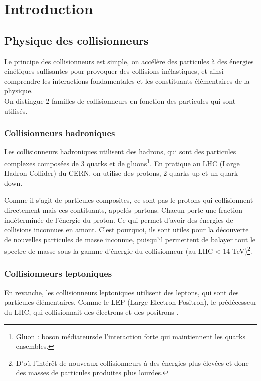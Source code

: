 \documentclass[10pt,a4paper]{report}
\begin{document}
\chapter{Introduction}

\section{Physique des collisionneurs}

Le principe des collisionneurs est simple, on accélère des particules à des 
énergies cinétiques suffisantes pour provoquer des collisions inélastiques, et ainsi comprendre les interactions fondamentales et les constituants élémentaires de la physique.\\

On distingue 2 familles de collisionneurs en fonction des particules qui sont utilisés.

\subsection{Collisionneurs hadroniques}

Les collisionneurs hadroniques utilisent des hadrons, qui sont des 
particules complexes composées de 3 quarks et de gluons\footnote{Gluon : boson médiateursde l'interaction forte qui maintiennent les quarks ensembles.}. 
En pratique au LHC (Large Hadron Collider) du CERN, on utilise des protons, 2 quarks up et un quark down. 

Comme il s'agit de particules composites, ce sont pas le protons qui collisionnent directement mais ces contituants, appelés partons. Chacun porte une fraction indéterminée de l'énergie du proton. 
Ce qui permet d'avoir des énergies de collisions inconnues en amont.
C'est pourquoi, ils sont utiles pour la découverte de nouvelles particules de masse inconnue, puisqu'il permettent de balayer tout le spectre de masse sous la gamme d'énergie du collisionneur (au LHC < 14 TeV)\footnote{D'où l'intérêt de nouveaux collisionneurs à des énergies plus élevées et donc des masses de particules produites plus lourdes.}.

\subsection{Collisionneurs leptoniques}

En revanche, les collisionneurs leptoniques utilisent des leptons, qui sont des particules élémentaires. Comme le LEP (Large Electron-Positron), le prédécesseur du LHC, qui collisionnait des électrons et des positrons \cite{cern:lep}.
\end{document}
